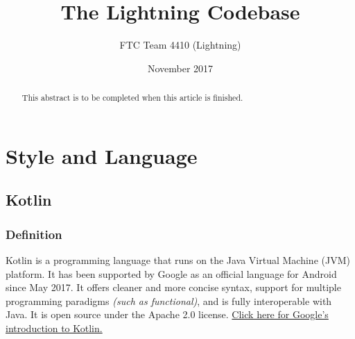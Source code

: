 \documentclass{article}
\begin{document}
\title{The Lightning Codebase}
\author{FTC Team 4410 (Lightning)}
\date{November 2017}
\maketitle

\begin{abstract}
This abstract is to be completed when this article is finished.
\end{abstract}
\section{Style and Language}

\subsection{Kotlin}

\subsubsection{Definition}
Kotlin is a programming language that runs on the Java Virtual Machine (JVM) platform. It has been supported by Google as an official language for Android since May 2017. It offers cleaner and more concise syntax, support for multiple programming paradigms \textit{(such as functional)}, and is fully interoperable with Java. It is open source under the Apache 2.0 license. \href{https://developer.android.com/kotlin/index.html}{Click here for Google's introduction to Kotlin.}
\end{document}
